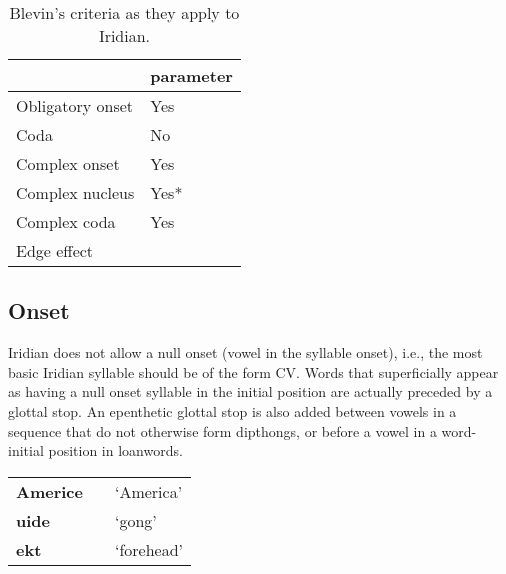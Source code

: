 \begin{table}[h!]
	\centering
	\caption{Blevin's criteria as they apply to Iridian.}
	\begin{tabularx}{0.6\textwidth}{YM}
		\toprule
		& {\sc parameter}\\
		\midrule
		Obligatory onset & Yes\\
		Coda & No\\
		Complex onset & Yes\\
		Complex nucleus & Yes*\\
		Complex coda & Yes\\
		Edge effect & \\
		\bottomrule
	\end{tabularx}
\end{table}


\subsection{Onset}

\par Iridian does not allow a null onset (vowel in the syllable onset), i.e., the most basic Iridian syllable should be of the form CV. Words that superficially appear as having a null onset syllable in the initial position are actually preceded by a glottal stop. An epenthetic glottal stop is also added between vowels in a sequence that do not otherwise form dipthongs, or before a vowel in a word-initial position in loanwords.

\begin{center} \small
	\begin{tabularx}{0.8\textwidth}{>{\bfseries}YYY}
		Americe &  &`America'\\
		uide&& `gong'\\
		ekt&&`forehead'\\
	\end{tabularx}
\end{center}

